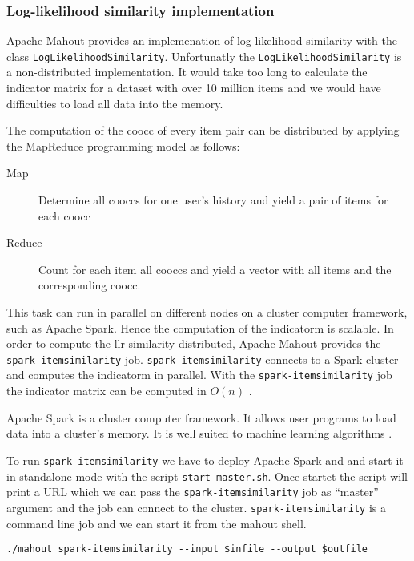 \subsubsection{Log-likelihood similarity implementation}
\label{sec:llrimpl}

Apache Mahout provides an implemenation of log-likelihood similarity with the class \verb|LogLikelihoodSimilarity|. Unfortunatly the \verb|LogLikelihoodSimilarity| is a non-distributed implementation. It would take too long to calculate the indicator matrix for a dataset with over 10 million items and we would have difficulties to load all data into the memory. 

The computation of the \gls{coocc} of every item pair can be distributed by applying the MapReduce programming model as follows:
\begin{description}
\item[Map] Determine all \glspl{coocc} for one user's history and yield a pair of items for each \gls{coocc}
\item[Reduce] Count for each item all \glspl{coocc} and yield a vector with all items and the corresponding \gls{coocc}.
\end{description}

This task can run in parallel on different nodes on a cluster computer framework, such as Apache Spark. Hence the computation of the \gls{indicatorm} is \gls{scalable}.
In order to compute the \gls{llr} similarity distributed, Apache Mahout provides the \verb|spark-itemsimilarity| job. \verb|spark-itemsimilarity| connects to a Spark cluster and computes the \gls{indicatorm} in parallel.  With the \verb|spark-itemsimilarity| job the indicator matrix can be computed in $O(n)$ \cite{Schelter}. 

Apache Spark is a cluster computer framework. It allows user programs to load data into a cluster's memory. It is well suited to machine learning algorithms \cite{Karau}.

To run \verb|spark-itemsimilarity| we have to deploy Apache Spark and and start it in standalone mode with the script \verb|start-master.sh|. Once startet the script will print a URL which we can pass the \verb|spark-itemsimilarity| job as ``master'' argument and the job can connect to the cluster. \verb|spark-itemsimilarity| is a command line job and we can start it from the mahout shell.

\begin{verbatim}
./mahout spark-itemsimilarity --input $infile --output $outfile
\end{verbatim}

